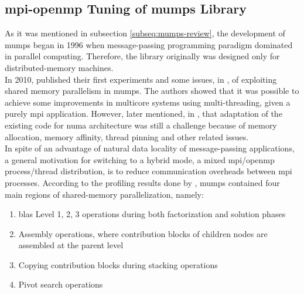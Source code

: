 \subsection{\gls{mpi}-\gls{openmp} Tuning of \gls{mumps} Library}
\label{subseq:mpi-openmp}


As it was mentioned in subsection \ref{subseq:mumps-review}, the development of \gls{mumps} began in 1996 when message-passing programming paradigm dominated in parallel computing. Therefore, the library originally was designed only for distributed-memory machines.\\

In 2010,  \citeauthor{chowdhury2010some} published their first experiments and some issues, in \cite{chowdhury2010some}, of exploiting shared memory parallelism in \gls{mumps}. The authors showed that it was possible to achieve some improvements in multicore systems using multi-threading, given a purely \gls{mpi} application. However, later \citeauthor{l2013introduction} mentioned, in \cite{l2013introduction}, that adaptation of the existing code for \gls{numa} architecture was still a challenge because of memory allocation, memory affinity, thread pinning and other related issues.\\


In spite of an advantage of natural data locality of message-passing applications, a general motivation for switching to a hybrid mode, a mixed \gls{mpi}/\gls{openmp} process/thread distribution, is to reduce communication overheads between \gls{mpi} processes. According to the profiling results done by \citeauthor{chowdhury2010some}, \gls{mumps} contained four main regions of shared-memory parallelization, namely: 

\begin{enumerate}

	\item \gls{blas} Level 1, 2, 3 operations during both factorization and solution phases \label{openmp-blocks-1}
	
	\item Assembly operations, where contribution blocks of children nodes are assembled at the parent level \label{openmp-blocks-2}
	
	\item Copying contribution blocks during stacking operations \label{openmp-blocks-3}
	
	\item Pivot search operations \label{openmp-blocks-4}

\end{enumerate}


